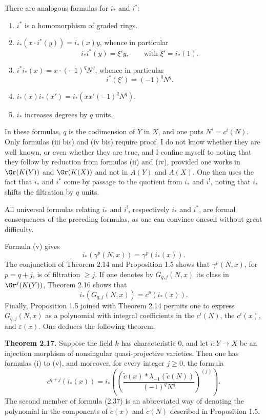 There are analogous formulas for $i_*$ and $i^*$:
\begin{enumerate}[label=(\roman* bis)]
\item $i^*$ is a homomorphism of graded rings.
\item $i_*(x\cdot i^*(y))=i_*(x)y$, whence in particular
\[
 i_*i^*(y)=\xi' y,
\qquad \text{with }\xi'=i_*(1).
\]
\item $i^*i_*(x)=x\cdot (-1)^qN^q$, whence in particular
\[
 i^*(\xi')=(-1)^qN^q.
\]
\item $i_*(x)i_*(x')=i_*(xx'(-1)^qN^q)$.
\item $i_*$ increases degrees by $q$ units.
\end{enumerate}
In these formulas, $q$ is the codimension of $Y$ in $X$, and one puts $N^i=c^i(N)$. Only formulas (iii bis) and (iv bis) require proof. I do not know whether they are well known, or even whether they are true, and I confine myself to noting that they follow by reduction from formulas (ii) and (iv), provided one works in $\Gr(K(Y))$ and $\Gr(K(X))$ and not in $A(Y)$ and $A(X)$. One then uses the fact that $i_*$ and $i^*$ come by passage to the quotient from $i_*$ and $i^!$, noting that $i_*$ shifts the filtration by $q$ units.

All universal formulas relating $i_*$ and $i^!$, respectively $i_*$ and $i^*$, are formal consequences of the preceding formulas, as one can convince oneself without great difficulty.

Formula (v) gives
\[
 i_*(\gamma^p(N,x))=\gamma^p(i_*(x)).
\]
The conjunction of Theorem 2.14 and Proposition 1.5 shows that $\gamma^p(N,x)$, for $p=q+j$, is of filtration $\geq j$. If one denotes by $G_{q,j}(N,x)$ its class in $\Gr^j(K(Y))$, Theorem 2.16 shows that
\[
 i_*(G_{q,j}(N,x))=c^p(i_*(x)).
\]
Finally, Proposition 1.5 joined with Theorem 2.14 permits one to express $G_{q,j}(N,x)$ as a polynomial with integral coefficients in the $c^i(N)$, the $c^i(x)$, and $\varepsilon(x)$. One deduces the following theorem.

\textbf{Theorem 2.17.} Suppose the field $k$ has characteristic $0$, and let $i:Y\to X$ be an injection morphism of nonsingular quasi-projective varieties. Then one has formulas (i) to (v), and moreover, for every integer $j\geq 0$, the formula
\begin{equation}\tag{2.37}
 c^{q+j}(i_*(x))=
 i_*\left(\left(\frac{\widetilde c(x)*\lambda_{-1}(\widetilde c(N))}{(-1)^qN^q}\right)^{(j)}\right).
\end{equation}
The second member of formula (2.37) is an abbreviated way of denoting the polynomial in the components of $\widetilde c(x)$ and $\widetilde c(N)$ described in Proposition 1.5.

